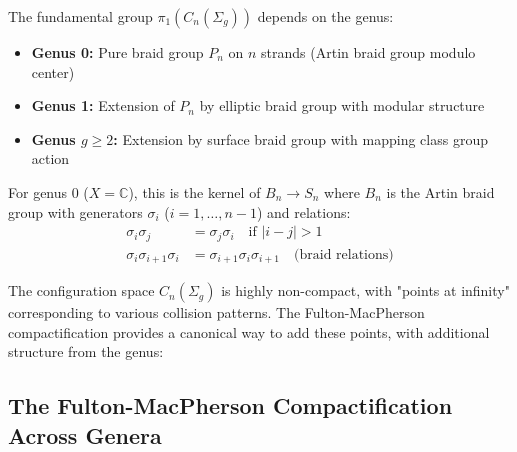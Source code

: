 \begin{proposition}
The fundamental group $\pi_1(C_n(\Sigma_g))$ depends on the genus:
\begin{itemize}
\item \textbf{Genus 0:} Pure braid group $P_n$ on $n$ strands (Artin braid group modulo center)
\item \textbf{Genus 1:} Extension of $P_n$ by elliptic braid group with modular structure
\item \textbf{Genus $g \geq 2$:} Extension by surface braid group with mapping class group action
\end{itemize}

For genus 0 ($X = \mathbb{C}$), this is the kernel of $B_n \to S_n$ where $B_n$ is the Artin braid group with generators $\sigma_i$ ($i = 1, \ldots, n-1$) and relations:
\begin{align}
\sigma_i\sigma_j &= \sigma_j\sigma_i \quad \text{if } |i-j| > 1 \\
\sigma_i\sigma_{i+1}\sigma_i &= \sigma_{i+1}\sigma_i\sigma_{i+1} \quad \text{(braid relations)}
\end{align}
\end{proposition}
 
The configuration space $C_n(\Sigma_g)$ is highly non-compact, with "points at infinity" corresponding to various collision patterns. The Fulton-MacPherson compactification provides a canonical way to add these points, with additional structure from the genus:
 
\subsection{The Fulton-MacPherson Compactification Across Genera}
 
